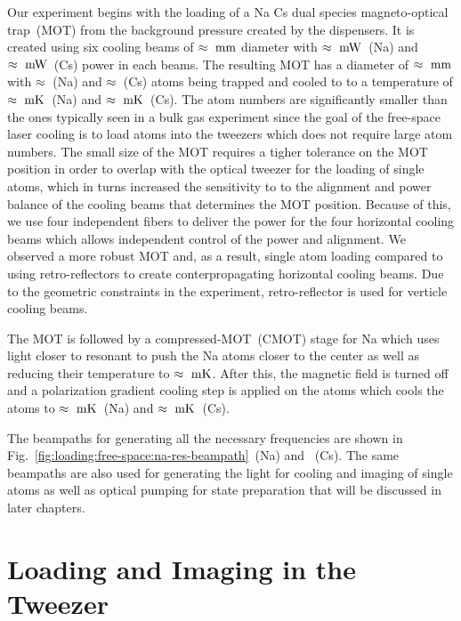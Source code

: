 Our experiment begins with the loading of a Na Cs dual species magneto-optical trap~(MOT)
from the background pressure created by the dispensers.
It is created using six cooling beams of $\approx\todo{number}~\mathrm{mm}$ diameter
with $\approx\todo{number}~\mathrm{mW}$~(Na) and $\approx\todo{number}~\mathrm{mW}$~(Cs)
power in each beams.
The resulting MOT has a diameter of $\approx\todo{number}~\mathrm{mm}$
with $\approx\todo{number}$~(Na) and $\approx\todo{number}$~(Cs) atoms being trapped
and cooled to to a temperature of $\approx\todo{number}~\mathrm{mK}$~(Na)
and $\approx\todo{number}~\mathrm{mK}$~(Cs).
The atom numbers are significantly smaller than the ones typically seen in a bulk gas experiment
since the goal of the free-space laser cooling is to load atoms into the tweezers
which does not require large atom numbers.
The small size of the MOT requires a tigher tolerance on the MOT position
in order to overlap with the optical tweezer for the loading of single atoms,
which in turns increased the sensitivity to to the alignment
and power balance of the cooling beams that determines the MOT position.
Because of this, we use four independent fibers to deliver the power
for the four horizontal cooling beams which allows independent control
of the power and alignment.
We observed a more robust MOT and, as a result, single atom loading
compared to using retro-reflectors to create conterpropagating horizontal cooling beams.
Due to the geometric constraints in the experiment,
retro-reflector is used for verticle cooling beams.

The MOT is followed by a compressed-MOT~(CMOT) stage for Na
which uses light closer to resonant to push the Na atoms closer to the center
as well as reducing their temperature to $\approx\todo{number}~\mathrm{mK}$.
After this, the magnetic field is turned off and
a polarization gradient cooling step is applied on the atoms
which cools the atoms to $\approx\todo{number}~\mathrm{mK}$~(Na)
and $\approx\todo{number}~\mathrm{mK}$~(Cs).

The beampaths for generating all the necessary frequencies are shown in
Fig.~\ref{fig:loading:free-space:na-res-beampath}~(Na) and \todo{}~(Cs).
The same beampaths are also used for generating the light for cooling
and imaging of single atoms as well as optical pumping for state preparation
that will be discussed in later chapters.

\section{Loading and Imaging in the Tweezer}
\label{ch:loading:loading}

